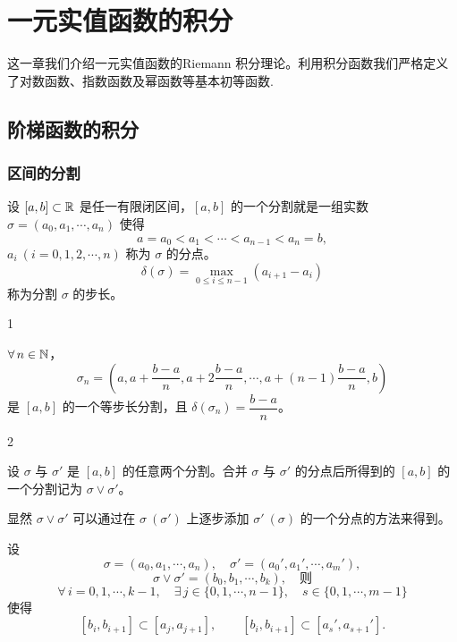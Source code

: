 \chapter{一元实值函数的积分}

这一章我们介绍一元实值函数的Riemann 积分理论。利用积分函数我们严格定义了对数函数、指数函数及幂函数等基本初等函数.

\section{阶梯函数的积分}

\subsection{区间的分割}
	\label{sec:5-1-1}

\begin{mydef*}{}

	设 \([a,b]\subset\mathbb{R}\) 是任一有限闭区间，\([a,b]\) 的一个分割就是一组实数 \(\sigma=(a_0,a_1,\cdots,a_n)\) 使得
	\[
	a=a_0<a_1<\cdots<a_{n-1}<a_n=b,
	\]
	\(a_i\ (i=0,1,2,\cdots,n)\) 称为 \(\sigma\) 的分点。
	\[
	\delta(\sigma)=\max_{0\le i\le n-1}(a_{i+1}-a_i)
	\]
	称为分割 \(\sigma\) 的步长。

\end{mydef*}

\begin{sourceexample}{1}

	\(\forall\,n\in\mathbb{N}\)，
	\[
	\sigma_n=\left(a,a+\frac{b-a}{n},a+2\frac{b-a}{n},\cdots,a+(n-1)\frac{b-a}{n},b\right)
	\]
	是 \([a,b]\) 的一个等步长分割，且 \(\delta(\sigma_n)=\dfrac{b-a}{n}\)。

\end{sourceexample}

\begin{sourceexample}{2}

	设 \(\sigma\) 与 \(\sigma'\) 是 \([a,b]\) 的任意两个分割。合并 \(\sigma\) 与 \(\sigma'\) 的分点后所得到的 \([a,b]\) 的一个分割记为 \(\sigma\vee\sigma'\)。

\end{sourceexample}

显然 \(\sigma\vee\sigma'\) 可以通过在 \(\sigma\ (\sigma')\) 上逐步添加 \(\sigma'\ (\sigma)\) 的一个分点的方法来得到。

设
\[
\sigma=(a_0,a_1,\cdots,a_n),\quad \sigma'=(a_0',a_1',\cdots,a_m'),
\]
\[
\sigma\vee\sigma'=(b_0,b_1,\cdots,b_k),\quad \text{则}
\]
\[
\forall\,i=0,1,\cdots,k-1,\quad \exists\,j\in\{0,1,\cdots,n-1\},\quad s\in\{0,1,\cdots,m-1\}
\]
使得
\[
[b_i,b_{i+1}]\subset[a_j,a_{j+1}],\qquad [b_i,b_{i+1}]\subset[a_s',a_{s+1}'].
\]

